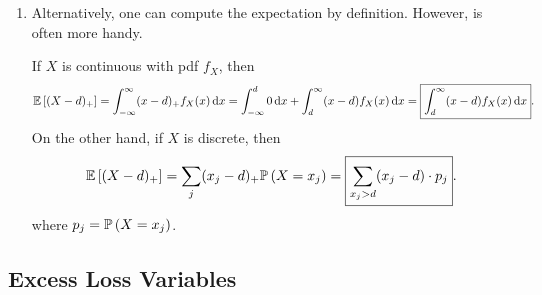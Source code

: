 \begin{enumerate}
\item Alternatively, one can compute the expectation by definition. However,
 is often more handy.

If \(X\) is continuous with pdf \(f_X\), then
\[
\mathbb{E}\left[(X-d)_{+}\right]=\int_{-\infty}^{\infty}(x-d)_{+}f_X(x)\dd{x}
=\int_{-\infty}^{d}0\dd{x}+\int_{d}^{\infty}(x-d)f_X(x)\dd{x}
=\boxed{\int_{d}^{\infty}(x-d)f_X(x)\dd{x}}.
\]
On the other hand, if \(X\) is discrete, then
\[
\mathbb{E}\left[(X-d)_{+}\right]=\sum_{j}^{}(x_j-d)_{+}\mathbb{P}\left(X=x_j\right)
=\boxed{\sum_{x_j>d}^{}(x_j-d)\cdot p_j}.
\]
where \(p_j=\mathbb{P}\left(X=x_j\right)\).

\end{enumerate}
\subsection{Excess Loss Variables}
